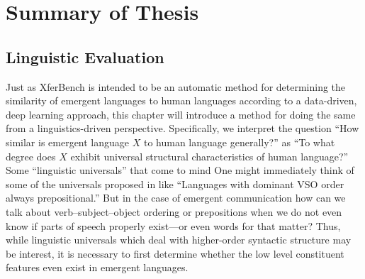 

\section{Summary of Thesis}


\subsection{Linguistic Evaluation}

Just as XferBench is intended to be an automatic method for determining the similarity of emergent languages to human languages according to a data-driven, deep learning approach, this chapter will introduce a method for doing the same from a linguistics-driven perspective.
Specifically, we interpret the question ``How similar is emergent language $X$ to human language generally?'' as ``To what degree does $X$ exhibit universal structural characteristics of human language?''
Some ``linguistic universals'' that come to mind 
One might immediately think of some of the universals proposed in \citet{greenberg1963universals} like ``Languages with dominant VSO order always prepositional.''
But in the case of emergent communication how can we talk about verb--subject--object ordering or prepositions when we do not even know if parts of speech properly exist---or even words for that matter?
Thus, while linguistic universals which deal with higher-order syntactic structure may be interest, it is necessary to first determine whether the low level constituent features even exist in emergent languages.



